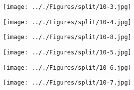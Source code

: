 \documentclass[onecolumn,11pt]{report}
\def\lthtmlcheckvsize{\ifdim\ht\sizebox<\vsize 
  \ifdim\wd\sizebox<\hsize\expandafter\hfill\fi \expandafter\vfill
  \else\expandafter\vss\fi}%
\begin{document}
{\newpage\clearpage
{}%
\texttt{[image: .././Figures/split/10-3.jpg]}%
\lthtmlpictureZ
\lthtmlcheckvsize\clearpage}

{\newpage\clearpage
{}%
\texttt{[image: .././Figures/split/10-4.jpg]}%
\lthtmlpictureZ
\lthtmlcheckvsize\clearpage}

{\newpage\clearpage
{}%
\texttt{[image: .././Figures/split/10-8.jpg]}%
\lthtmlpictureZ
\lthtmlcheckvsize\clearpage}

{\newpage\clearpage
{}%
\texttt{[image: .././Figures/split/10-5.jpg]}%
\lthtmlpictureZ
\lthtmlcheckvsize\clearpage}

{\newpage\clearpage
{}%
\texttt{[image: .././Figures/split/10-6.jpg]}%
\lthtmlpictureZ
\lthtmlcheckvsize\clearpage}

{\newpage\clearpage
{}%
\texttt{[image: .././Figures/split/10-7.jpg]}%
\lthtmlpictureZ
\lthtmlcheckvsize\clearpage}

\end{document}
